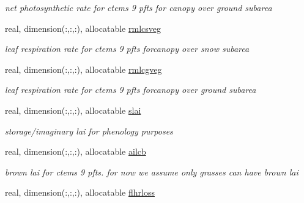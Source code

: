 \begin{DoxyCompactItemize}
\begin{DoxyCompactList}\small\item\em net photosynthetic rate for ctems 9 pfts for canopy over ground subarea \end{DoxyCompactList}\item 
\hypertarget{structctem__statevars_1_1veg__rot_a24258398d564b77b6de4ba963fe401da}{}real, dimension(\+:,\+:,\+:), allocatable \hyperlink{structctem__statevars_1_1veg__rot_a24258398d564b77b6de4ba963fe401da}{rmlcsveg}\label{structctem__statevars_1_1veg__rot_a24258398d564b77b6de4ba963fe401da}

\begin{DoxyCompactList}\small\item\em leaf respiration rate for ctems 9 pfts forcanopy over snow subarea \end{DoxyCompactList}\item 
\hypertarget{structctem__statevars_1_1veg__rot_aa934b8704b00e861cdd9ee37bc3f7d7d}{}real, dimension(\+:,\+:,\+:), allocatable \hyperlink{structctem__statevars_1_1veg__rot_aa934b8704b00e861cdd9ee37bc3f7d7d}{rmlcgveg}\label{structctem__statevars_1_1veg__rot_aa934b8704b00e861cdd9ee37bc3f7d7d}

\begin{DoxyCompactList}\small\item\em leaf respiration rate for ctems 9 pfts forcanopy over ground subarea \end{DoxyCompactList}\item 
\hypertarget{structctem__statevars_1_1veg__rot_adcf86b7d54a6a0b410a1ba7528cf5018}{}real, dimension(\+:,\+:,\+:), allocatable \hyperlink{structctem__statevars_1_1veg__rot_adcf86b7d54a6a0b410a1ba7528cf5018}{slai}\label{structctem__statevars_1_1veg__rot_adcf86b7d54a6a0b410a1ba7528cf5018}

\begin{DoxyCompactList}\small\item\em storage/imaginary lai for phenology purposes \end{DoxyCompactList}\item 
\hypertarget{structctem__statevars_1_1veg__rot_a8da78b4c52416fe4ade7ebde7d47f175}{}real, dimension(\+:,\+:,\+:), allocatable \hyperlink{structctem__statevars_1_1veg__rot_a8da78b4c52416fe4ade7ebde7d47f175}{ailcb}\label{structctem__statevars_1_1veg__rot_a8da78b4c52416fe4ade7ebde7d47f175}

\begin{DoxyCompactList}\small\item\em brown lai for ctem\textquotesingle{}s 9 pfts. for now we assume only grasses can have brown lai \end{DoxyCompactList}\item 
\hypertarget{structctem__statevars_1_1veg__rot_a7fb07bcb493ddd0f2f130439e14480bf}{}real, dimension(\+:,\+:,\+:), allocatable \hyperlink{structctem__statevars_1_1veg__rot_a7fb07bcb493ddd0f2f130439e14480bf}{flhrloss}\label{structctem__statevars_1_1veg__rot_a7fb07bcb493ddd0f2f130439e14480bf}


\end{DoxyCompactItemize}
